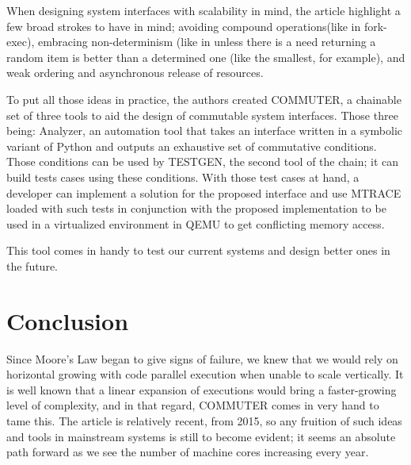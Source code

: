\documentclass[12pt]{article}
\begin{document}
When designing system interfaces with scalability in mind, the article highlight a few broad strokes to have in mind; avoiding compound operations(like in fork-exec), embracing non-determinism (like in unless there is a need returning a random item is better than a determined one (like the smallest, for example), and weak ordering and asynchronous release of resources.

To put all those ideas in practice, the authors created COMMUTER, a chainable set of three tools to aid the design of commutable system interfaces. Those three being: Analyzer, an automation tool that takes an interface written in a symbolic variant of Python and outputs an exhaustive set of commutative conditions. Those conditions can be used by TESTGEN, the second tool of the chain; it can build tests cases using these conditions. With those test cases at hand, a developer can implement a solution for the proposed interface and use MTRACE loaded with such tests in conjunction with the proposed implementation to be used in a virtualized environment in QEMU to get conflicting memory access.

This tool comes in handy to test our current systems and design better ones in the future.

\section{Conclusion}
Since Moore's Law began to give signs of failure, we knew that we would rely on horizontal growing with code parallel execution when unable to scale vertically. It is well known that a linear expansion of executions would bring a faster-growing level of complexity, and in that regard, COMMUTER comes in very hand to tame this. The article is relatively recent, from 2015, so any fruition of such ideas and tools in mainstream systems is still to become evident; it seems an absolute path forward as we see the number of machine cores increasing every year.





\end{document}
